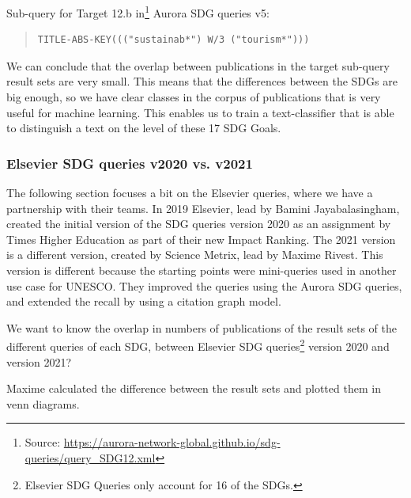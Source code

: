 \documentclass{article}
\begin{document}
Sub-query for Target 12.b in\footnote{ Source: \url{https://aurora-network-global.github.io/sdg-queries/query_SDG12.xml}} Aurora SDG queries v5:
\begin{quote}
\begin{verbatim}
TITLE-ABS-KEY((("sustainab*") W/3 ("tourism*")))
\end{verbatim}
\end{quote}

We can conclude that the overlap between publications in the target sub-query result sets are very small. This means that the differences between the SDGs are big enough, so we have clear classes in the corpus of publications that is very useful for machine learning. This enables us to train a text-classifier that is able to distinguish a text on the level of these 17 SDG Goals.


\subsubsection{Elsevier SDG queries v2020 vs. v2021}
The following section focuses a bit on the Elsevier queries, where we have a partnership with their teams. In 2019 Elsevier, lead by Bamini Jayabalasingham, created the initial version of the SDG queries version 2020 as an assignment by Times Higher Education as part of their new Impact Ranking. \cite{jayabalasingham_identifying_2019}
The 2021 version is a different version, created by Science Metrix, lead by Maxime Rivest. \cite{rivest_improving_2021} This version is different because the starting points were mini-queries used in another use case for UNESCO. They improved the queries using the Aurora SDG queries, and extended the recall by using a citation graph model.

We want to know the overlap in numbers of publications of the result sets of the different queries of each SDG, between Elsevier SDG queries\footnote{Elsevier SDG Queries only account for 16 of the SDGs.} version 2020 and version 2021?

Maxime calculated the difference between the result sets and plotted them in venn diagrams.
\end{document}
